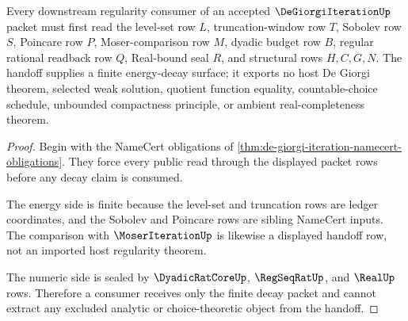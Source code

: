 \begin{theorem}
\label{thm:de-giorgi-iteration-energy-decay-handoff}
Every downstream regularity consumer of an accepted $\DeGiorgiIterationUp$ packet must first read the level-set row $L$, truncation-window row $T$, Sobolev row $S$, Poincare row $P$, Moser-comparison row $M$, dyadic budget row $B$, regular rational readback row $Q$, Real-bound seal $R$, and structural rows $H,C,G,N$. The handoff supplies a finite energy-decay surface; it exports no host De Giorgi theorem, selected weak solution, quotient function equality, countable-choice schedule, unbounded compactness principle, or ambient real-completeness theorem.
\end{theorem}
\begin{proof}
Begin with the NameCert obligations of \autoref{thm:de-giorgi-iteration-namecert-obligations}. They force every public read through the displayed packet rows before any decay claim is consumed.

The energy side is finite because the level-set and truncation rows are ledger coordinates, and the Sobolev and Poincare rows are sibling NameCert inputs. The comparison with $\MoserIterationUp$ is likewise a displayed handoff row, not an imported host regularity theorem.

The numeric side is sealed by $\DyadicRatCoreUp$, $\RegSeqRatUp$, and $\RealUp$ rows. Therefore a consumer receives only the finite decay packet and cannot extract any excluded analytic or choice-theoretic object from the handoff.
\end{proof}




